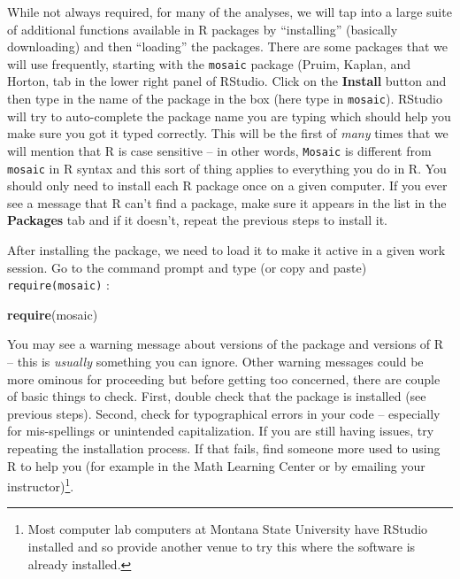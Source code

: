 \documentclass[]{book}
\newenvironment{Shaded}{\begin{snugshade}}{\end{snugshade}}
\newcommand{\KeywordTok}[1]{\textcolor[rgb]{0.13,0.29,0.53}{\textbf{#1}}}
\newcommand{\NormalTok}[1]{#1}
\let\rmarkdownfootnote\footnote%
\def\footnote{\protect\rmarkdownfootnote}
\begin{document}
While not always required, for many of the analyses, we will tap into a
large suite of additional functions available in R packages by
``installing'' (basically downloading) and then ``loading'' the
packages. There are some packages that we will use frequently, starting
with the \texttt{mosaic} package (Pruim, Kaplan, and Horton, tab in the
lower right panel of RStudio. Click on the \textbf{Install} button and
then type in the name of the package in the box (here type in
\texttt{mosaic}). RStudio will try to auto-complete the package name you
are typing which should help you make sure you got it typed correctly.
This will be the first of \emph{many} times that we will mention that R
is case sensitive -- in other words, \texttt{Mosaic} is different from
\texttt{mosaic} in R syntax and this sort of thing applies to everything
you do in R. You should only need to install each R package once on a
given computer. If you ever see a message that R can't find a package,
make sure it appears in the list in the \textbf{Packages} tab and if it
doesn't, repeat the previous steps to install it.

After installing the package, we need to load it to make it active in a
given work session. Go to the command prompt and type (or copy and
paste) \texttt{require(mosaic)} :

\begin{Shaded}
\begin{Highlighting}[]
\KeywordTok{require}\NormalTok{(mosaic)}
\end{Highlighting}
\end{Shaded}

You may see a warning message about versions of the package and versions
of R -- this is \emph{usually} something you can ignore. Other warning
messages could be more ominous for proceeding but before getting too
concerned, there are couple of basic things to check. First, double
check that the package is installed (see previous steps). Second, check
for typographical errors in your code -- especially for mis-spellings or
unintended capitalization. If you are still having issues, try repeating
the installation process. If that fails, find someone more used to using
R to help you (for example in the Math Learning Center or by emailing
your instructor)\footnote{Most computer lab computers at Montana State
  University have RStudio installed and so provide another venue to try
  this where the software is already installed.}.
\end{document}
